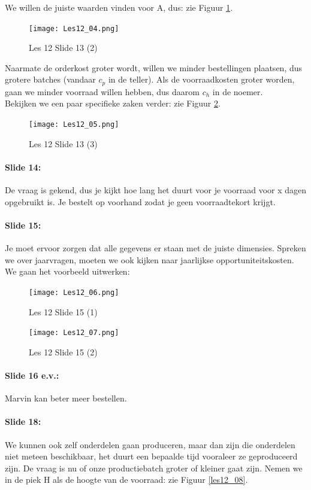 \documentclass[10pt,a4paper]{report}
\begin{document}
We willen de juiste waarden vinden voor A, dus: zie Figuur \ref{les12_04}.\\

\begin{figure}[h!]
\centering
\texttt{[image: Les12\_04.png]}
\caption{Les 12 Slide 13 (2)} 
\label{les12_04}
\end{figure}

Naarmate de orderkost groter wordt, willen we minder bestellingen plaatsen, dus grotere batches (vandaar $c_{p}$ in de teller). Als de voorraadkosten groter worden, gaan we minder voorraad willen hebben, dus daarom $c_{h}$ in de noemer.\\
Bekijken we een paar specifieke zaken verder: zie Figuur \ref{les12_05}.

\begin{figure}[h!]
\centering
\texttt{[image: Les12\_05.png]}
\caption{Les 12 Slide 13 (3)} 
\label{les12_05}
\end{figure}

\paragraph{Slide 14:} De vraag is gekend, dus je kijkt hoe lang het duurt voor je voorraad voor x dagen opgebruikt is. Je bestelt op voorhand zodat je geen voorraadtekort krijgt.

\paragraph{Slide 15:} Je moet ervoor zorgen dat alle gegevens er staan met de juiste dimensies. Spreken we over jaarvragen, moeten we ook kijken naar jaarlijkse opportuniteitskosten. We gaan het voorbeeld uitwerken:

\begin{figure}[h!]
\centering
\texttt{[image: Les12\_06.png]}
\caption{Les 12 Slide 15 (1)} 
\label{les12_06}
\end{figure}

\begin{figure}[h!]
\centering
\texttt{[image: Les12\_07.png]}
\caption{Les 12 Slide 15 (2)} 
\label{les12_07}
\end{figure}

\paragraph{Slide 16 e.v.:} Marvin kan beter meer bestellen.

\paragraph{Slide 18:} We kunnen ook zelf onderdelen gaan produceren, maar dan zijn die onderdelen niet meteen beschikbaar, het duurt een bepaalde tijd vooraleer ze geproduceerd zijn. De vraag is nu of onze productiebatch groter of kleiner gaat zijn. Nemen we in de piek H als de hoogte van de voorraad: zie Figuur \ref{les12_08}. \\
\end{document}

